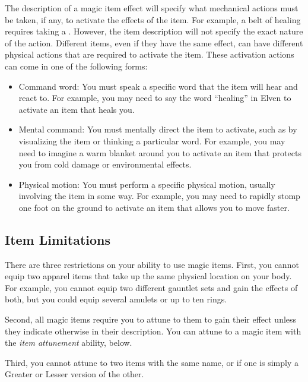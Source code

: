         The description of a magic item effect will specify what mechanical actions must be taken, if any, to activate the effects of the item.
        For example, a belt of healing requires taking a .
        However, the item description will not specify the exact nature of the action.
        Different items, even if they have the same effect, can have different physical actions that are required to activate the item.
        These activation actions can come in one of the following forms:
        \begin{itemize}
           \item Command word: You must speak a specific word that the item will hear and react to.
                For example, you may need to say the word ``healing'' in Elven to activate an item that heals you.
            \item Mental command: You must mentally direct the item to activate, such as by visualizing the item or thinking a particular word.
                For example, you may need to imagine a warm blanket around you to activate an item that protects you from cold damage or environmental effects.
            \item Physical motion: You must perform a specific physical motion, usually involving the item in some way.
                For example, you may need to rapidly stomp one foot on the ground to activate an item that allows you to move faster.
        \end{itemize}


    \subsection{Item Limitations}

        There are three restrictions on your ability to use magic items.
        First, you cannot equip two apparel items that take up the same physical location on your body.
        For example, you cannot equip two different gauntlet sets and gain the effects of both, but you could equip several amulets or up to ten rings.

        Second, all magic items require you to attune to them to gain their effect unless they indicate otherwise in their description.
        You can attune to a magic item with the \textit{item attunement} ability, below.

        Third, you cannot attune to two items with the same name, or if one is simply a Greater or Lesser version of the other.

